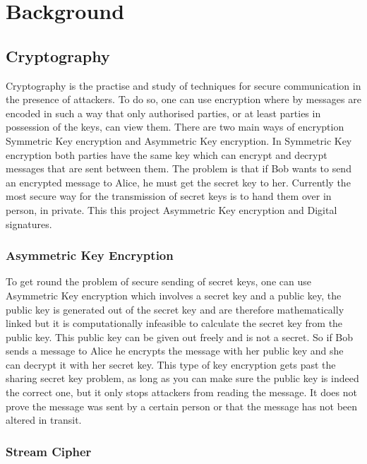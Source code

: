 
\chapter{Background}
\label{back}

\section{Cryptography}

Cryptography is the practise and study of techniques for secure communication in the presence of attackers. To do so, one can use encryption where by messages are encoded in such a way that only authorised parties, or at least parties in possession of the keys, can view them. There are two main ways of encryption Symmetric Key encryption and Asymmetric Key encryption. In Symmetric Key encryption both parties have the same key which can encrypt and decrypt messages that are sent between them. The problem is that if Bob wants to send an encrypted message to Alice, he must get the secret key to her. Currently the most secure way for the transmission of secret keys is to hand them over in person, in private. This this project Asymmetric Key encryption and Digital signatures.

\subsection{Asymmetric Key Encryption}

To get round the problem of secure sending of secret keys, one can use Asymmetric Key encryption which involves a secret key and a public key, the public key is generated out of the secret key and are therefore mathematically linked but it is computationally infeasible to calculate the secret key from the public key. This public key can be given out freely and is not a secret. So if Bob sends a message to Alice he encrypts the message with her public key and she can decrypt it with her secret key. This type of key encryption gets past the sharing secret key problem, as long as you can make sure the public key is indeed the correct one, but it only stops attackers from reading the message. It does not prove the message was sent by a certain person or that the message has not been altered in transit.

\subsection{Stream Cipher}

